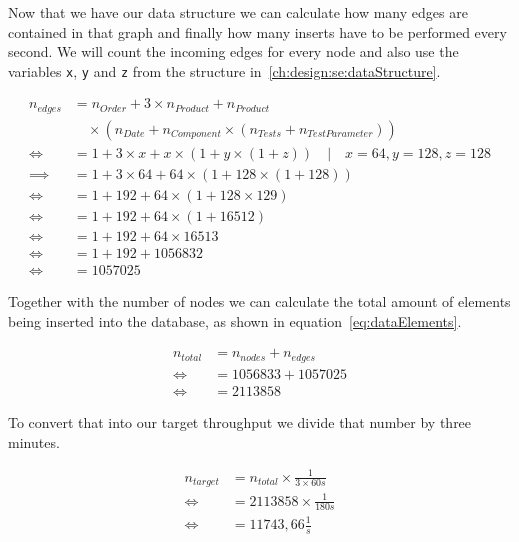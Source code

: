 Now that we have our data structure we can calculate how many edges are contained in that graph and finally how many inserts have to be performed every second.
We will count the incoming edges for every node and also use the variables \texttt{x}, \texttt{y} and \texttt{z} from the structure in~\ref{ch:design:se:dataStructure}.

\begin{equation}
  \label{eq:dataEdges}
  \begin{aligned}
    n_{edges} &= n_{Order} + 3 \times n_{Product} + n_{Product} \\
    &\quad \times (n_{Date} + n_{Component} \times (n_{Tests} + n_{TestParameter})) \\
    \iff &= 1 + 3 \times x + x \times (1 + y \times (1 + z)) \quad | \quad x = 64, y = 128, z = 128 \\
    \implies &= 1 + 3 \times 64 + 64 \times (1 + 128 \times (1 + 128)) \\
    \iff &= 1 + 192 + 64 \times (1 + 128 \times 129) \\
    \iff &= 1 + 192 + 64 \times (1 + 16512) \\
    \iff &= 1 + 192 + 64 \times 16513 \\
    \iff &= 1 + 192 + 1056832 \\
    \iff &= 1057025
  \end{aligned}
\end{equation}

Together with the number of nodes we can calculate the total amount of elements being inserted into the database,
as shown in equation~\ref{eq:dataElements}.

\begin{equation}
  \label{eq:dataElements}
  \begin{aligned}
    n_{total} &= n_{nodes} + n_{edges} \\
    \iff &= 1056833 + 1057025 \\
    \iff &= 2113858
  \end{aligned}
\end{equation}

To convert that into our target throughput we divide that number by three minutes.

\begin{equation}
  \label{eq:dataElements}
  \begin{aligned}
    n_{target} &= n_{total} \times \frac{1}{3 \times 60s} \\
    \iff &= 2113858 \times \frac{1}{180s} \\
    \iff &= 11743,66 \frac{1}{s}
  \end{aligned}
\end{equation}

